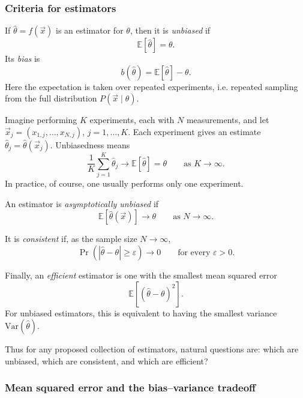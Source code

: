\documentclass[11pt, titlepage]{article} %
\numberwithin{equation}{section}
\theoremstyle{definition}
\numberwithin{assumption}{section}
\begin{document}
\subsubsection*{Criteria for estimators}

If $\hat{\theta}=f(\vec x)$ is an estimator for $\theta$, then it is \textit{unbiased} if
\begin{equation*}
    \mathbb{E}[\hat{\theta}]=\theta.
\end{equation*}
Its \textit{bias} is
\begin{equation*}
    b(\hat{\theta})=\mathbb{E}[\hat{\theta}]-\theta.
\end{equation*}
Here the expectation is taken over repeated experiments, i.e. repeated sampling from the full distribution $P(\vec x\mid \theta)$.

Imagine performing $K$ experiments, each with $N$ measurements, and let $\vec x_j=(x_{1,j},\dots,x_{N,j})$, $j=1,\dots,K$. Each experiment gives an estimate $\hat{\theta}_j=\hat{\theta}(\vec x_j)$. Unbiasedness means
\begin{equation*}
    \frac{1}{K}\sum_{j=1}^K \hat{\theta}_j \to \mathbb{E}[\hat{\theta}]=\theta
    \qquad \text{as } K\to\infty.
\end{equation*}
In practice, of course, one usually performs only one experiment.

An estimator is \textit{asymptotically unbiased} if
\begin{equation*}
    \mathbb{E}[\hat{\theta}(\vec x)]\to \theta
    \qquad \text{as } N\to\infty.
\end{equation*}

It is \textit{consistent} if, as the sample size $N\to\infty$,
\begin{equation*}
    \Pr\!\left(|\hat{\theta}-\theta|\ge \varepsilon\right)\to 0
    \qquad \text{for every } \varepsilon>0.
\end{equation*}

Finally, an \textit{efficient} estimator is one with the smallest mean squared error
\begin{equation*}
    \mathbb{E}\!\left[(\hat{\theta}-\theta)^2\right].
\end{equation*}
For unbiased estimators, this is equivalent to having the smallest variance $\mathrm{Var}(\hat{\theta})$.

Thus for any proposed collection of estimators, natural questions are: which are unbiased, which are consistent, and which are efficient?

\subsubsection*{Mean squared error and the bias--variance tradeoff}
\end{document}
